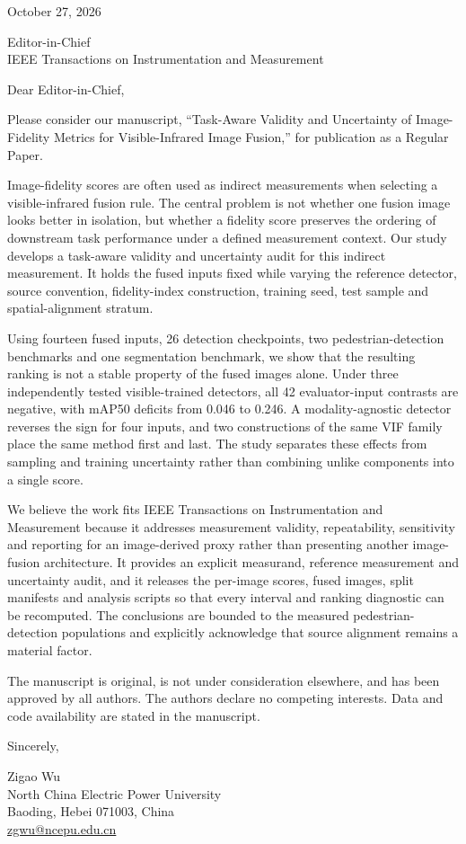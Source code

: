 \documentclass[11pt,a4paper]{article}
\begin{document}
October 27, 2026

Editor-in-Chief\\
IEEE Transactions on Instrumentation and Measurement

Dear Editor-in-Chief,

Please consider our manuscript, ``Task-Aware Validity and Uncertainty of
Image-Fidelity Metrics for Visible-Infrared Image Fusion,'' for publication as a
Regular Paper.

Image-fidelity scores are often used as indirect measurements when selecting a
visible-infrared fusion rule. The central problem is not whether one fusion image
looks better in isolation, but whether a fidelity score preserves the ordering of
downstream task performance under a defined measurement context. Our study develops
a task-aware validity and uncertainty audit for this indirect measurement. It holds
the fused inputs fixed while varying the reference detector, source convention,
fidelity-index construction, training seed, test sample and spatial-alignment stratum.

Using fourteen fused inputs, 26 detection checkpoints, two pedestrian-detection
benchmarks and one segmentation benchmark, we show that the resulting ranking is not
a stable property of the fused images alone. Under three independently tested
visible-trained detectors, all 42 evaluator-input contrasts are negative, with mAP50
deficits from 0.046 to 0.246. A modality-agnostic detector reverses the sign for four
inputs, and two constructions of the same VIF family place the same method first and
last. The study separates these effects from sampling and training uncertainty rather
than combining unlike components into a single score.

We believe the work fits IEEE Transactions on Instrumentation and Measurement because
it addresses measurement validity, repeatability, sensitivity and reporting for an
image-derived proxy rather than presenting another image-fusion architecture. It
provides an explicit measurand, reference measurement and uncertainty audit, and it
releases the per-image scores, fused images, split manifests and analysis scripts so
that every interval and ranking diagnostic can be recomputed. The conclusions are
bounded to the measured pedestrian-detection populations and explicitly acknowledge
that source alignment remains a material factor.

The manuscript is original, is not under consideration elsewhere, and has been
approved by all authors. The authors declare no competing interests. Data and code
availability are stated in the manuscript.

Sincerely,

Zigao Wu\\
North China Electric Power University\\
Baoding, Hebei 071003, China\\
\href{mailto:zgwu@ncepu.edu.cn}{zgwu@ncepu.edu.cn}
\end{document}
